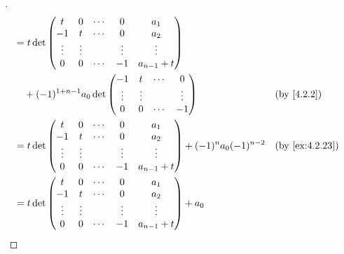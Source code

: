 \begin{proof}[]
\begin{align*}
     & = t \det\begin{pmatrix}
                 t      & 0      & \cdots & 0      & a_1           \\
                 -1     & t      & \cdots & 0      & a_2           \\
                 \vdots & \vdots &        & \vdots & \vdots        \\
                 0      & 0      & \cdots & -1     & a_{n - 1} + t
               \end{pmatrix}                                                                      \\
     & \quad + (-1)^{1 + n - 1} a_0 \det\begin{pmatrix}
                                          -1     & t      & \cdots & 0      \\
                                          \vdots & \vdots &        & \vdots \\
                                          0      & 0      & \cdots & -1
                                        \end{pmatrix}                                                &  & \by{4.2.2}                  \\
     & = t \det\begin{pmatrix}
                 t      & 0      & \cdots & 0      & a_1           \\
                 -1     & t      & \cdots & 0      & a_2           \\
                 \vdots & \vdots &        & \vdots & \vdots        \\
                 0      & 0      & \cdots & -1     & a_{n - 1} + t
               \end{pmatrix} + (-1)^n a_0 (-1)^{n - 2}                                            &  & \by{ex:4.2.23}                 \\
     & = t \det\begin{pmatrix}
                 t      & 0      & \cdots & 0      & a_1           \\
                 -1     & t      & \cdots & 0      & a_2           \\
                 \vdots & \vdots &        & \vdots & \vdots        \\
                 0      & 0      & \cdots & -1     & a_{n - 1} + t
               \end{pmatrix} + a_0                                                                      \\

\end{align*}
\end{proof}
